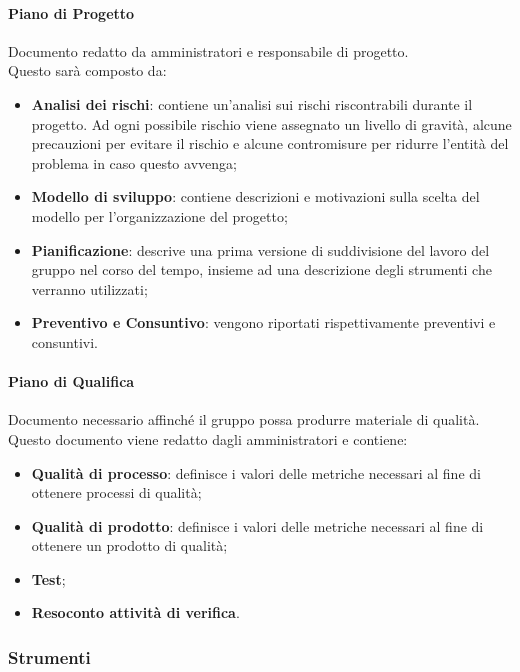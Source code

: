     \paragraph{Piano di Progetto}  \hfill \break
    Documento redatto da amministratori e responsabile di progetto. \\
Questo sarà composto da:
    \begin{itemize}
        \item \textbf{Analisi dei rischi}: contiene un'analisi sui rischi riscontrabili durante il progetto. Ad ogni possibile rischio viene assegnato un livello di gravità, alcune precauzioni per evitare il rischio e alcune contromisure per ridurre l'entità del problema in caso questo avvenga; 
        \item \textbf{Modello di sviluppo}: contiene descrizioni e motivazioni sulla scelta del modello per l'organizzazione del progetto;
        \item \textbf{Pianificazione}: descrive una prima versione di suddivisione del lavoro del gruppo nel corso del tempo, insieme ad una descrizione degli strumenti che verranno utilizzati;
        \item \textbf{Preventivo e Consuntivo}: vengono riportati rispettivamente preventivi e consuntivi.
    \end{itemize}

    \paragraph{Piano di Qualifica}  \hfill \break
    Documento necessario affinché il gruppo possa produrre materiale di qualità. \\
Questo documento viene redatto dagli amministratori e contiene:
    \begin{itemize}
        \item \textbf{Qualità di processo}: definisce i valori delle metriche necessari al fine di ottenere processi di qualità;
        \item \textbf{Qualità di prodotto}: definisce i valori delle metriche necessari al fine di ottenere un prodotto di qualità;
        \item \textbf{Test};
        \item \textbf{Resoconto attività di verifica}.
    \end{itemize}
    
\subsubsection{Strumenti}
